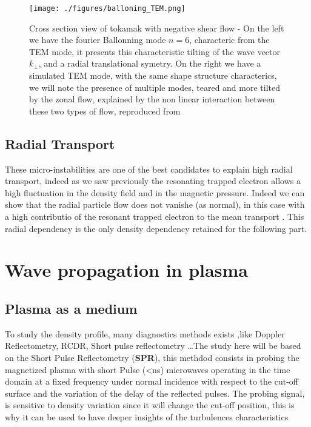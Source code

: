 \documentclass[11pt,a4paper,openany]{report}
\begin{document}
\begin{figure}[H]
    \centering
    \texttt{[image: ./figures/balloning\_TEM.png]}
    \caption{Cross section view of tokamak with negative shear flow - On the left we have the fourier Ballonning mode $n = 6$, characteric from the TEM mode, it presents this characteristic tilting of the wave vector $k_{\perp}$, and a radial translational symetry. On the right we have a simulated TEM mode, with the same shape structure characterics, we will note the presence of multiple modes, teared and more tilted by the zonal flow, explained by the non linear interaction between these two types of flow, reproduced from \cite{TEM_simulation,Ballooning_transform} }
    \label{}
\end{figure}
\begin{multicols}{2}
    \subsection{Radial Transport}
    These micro-instabilities are one of the best candidates to explain high radial transport, indeed as we saw previously the resonating trapped electron allows a high fluctuation in the density field and in the magnetic pressure. Indeed we can show that the radial particle flow does not vanishe (as normal), in this case with a high contributio of the resonant trapped electron to the mean transport \cite{San_diego}. This radial dependency is the only density dependency retained for the following part.

    \section{Wave propagation in plasma}
    \subsection{Plasma as a medium}
    To study the density profile, many diagnostics methods exists ,like Doppler Reflectometry, RCDR, Short pulse reflectometry \dots The study here will be based on the Short Pulse Reflectometry (\textbf{SPR}), this methdod consists in probing the magnetized plasma with short Pulse (<ns) microwaves operating in the time domain at a fixed frequency under normal incidence with respect to the cut-off surface and the variation of the delay of the reflected pulses. The probing signal, is sensitive to density variation since it will change the cut-off position, this is why it can
    be used to have deeper insights of the turbulences characteristics

\end{multicols}
\end{document}
